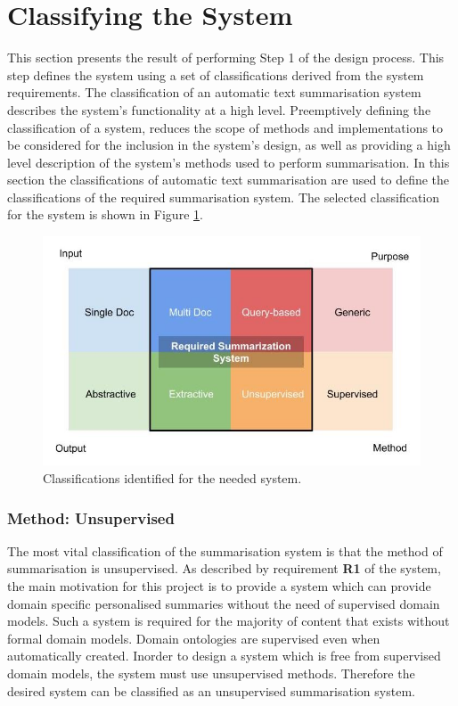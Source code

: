 \section{Classifying the System}
This section presents the result of performing Step 1 of the design process. This step defines the system using a set of classifications derived from the system requirements. The classification of an automatic text summarisation system describes the system’s functionality at a high level. Preemptively defining the classification of a system, reduces the scope of methods and implementations to be considered for the inclusion in the system’s design, as well as providing a high level description of the system’s methods used to perform summarisation. In this section the classifications of automatic text summarisation are used to define the classifications of the required summarisation system. The selected classification for the system is shown in Figure \ref{fig:classification}. 

\begin{figure}[h]
    \centering
         \includegraphics[width=.70\textwidth]{Figures/System_Classification.jpg}
          \caption{Classifications identified for the needed system.}
           \label{fig:classification}
\end{figure}

\subsubsection{Method: Unsupervised}
The most vital classification of the summarisation system is that the method of summarisation is unsupervised. As described by requirement \textbf{R1} of the system, the main motivation for this project is to provide a system which can provide domain specific personalised summaries without the need of supervised domain models. Such a system is required for the majority of content that exists without formal domain models. Domain ontologies are supervised even when automatically created. Inorder to design a system which is free from supervised domain models, the system must use unsupervised methods. Therefore the desired system can be classified as an unsupervised summarisation system.

